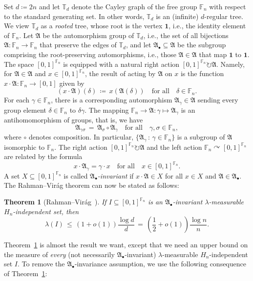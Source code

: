 \documentclass[10pt]{amsart}
\newtheorem{theo}[cdrthm]{Theorem}
\theoremstyle{definition}
\newcommand{\0}{\varnothing}
\newcommand{\set}[1]{\{#1\}}
\renewcommand{\leq}{\leqslant}
\newcommand{\defeq}{\coloneqq}
\newcommand{\racts}{\circlearrowright}
\newcommand{\F}{\mathbb{F}}
\newcommand{\bbT}{\mathbb{T}}
\newcommand{\bfun}{\mathbf{1}}
\newcommand{\frkA}{\mathfrak{A}}
\begin{document}
Set $d \defeq 2n$ and let $\bbT_d$ denote the Cayley graph of the free group $\F_n$ with respect to the standard generating set. In other words, $\bbT_d$ is an (infinite) $d$-regular tree. We view $\bbT_d$ as a \emph{rooted} tree, whose root is the vertex $\bfun$, i.e., the identity element of $\F_n$. Let $\frkA$ be the automorphism group of $\bbT_d$, i.e., the set of all bijections $\frkA \colon \F_n \to \F_n$ that preserve the edges of $\bbT_d$, and let $\frkA_\bullet \subseteq \frkA$ be the subgroup comprising the root-preserving automorphisms, i.e., those $\frkA \in \frkA$ that map $\bfun$ to $\bfun$. The space $[0,1]^{\F_n}$ is equipped with a natural right action $[0,1]^{\F_n} \racts \frkA$. Namely, for $\frkA \in \frkA$ and $x \in [0,1]^{\F_n}$, the result of acting by $\frkA$ on $x$ is the function $x \cdot \frkA \colon \F_n \to [0,1]$ given by
\[
(x \cdot \frkA)(\delta) \,
\defeq\, x(\frkA(\delta)) \quad \text{for all}\quad \delta \in \F_n.
\]
For each $\gamma \in \F_n$, there is a corresponding automorphism $\frkA_\gamma \in \frkA$ sending every group element $\delta \in \F_n$ to $\delta \gamma$. The mapping $\F_n \to \frkA \colon \gamma \mapsto \frkA_\gamma$ is an antihomomorphism of groups, that is, we have
\[
\frkA_{\gamma \sigma} \,=\, \frkA_\sigma \circ \frkA_\gamma \quad \text{for all}\quad\gamma
, \sigma \in \F_n,
\]
where $\circ$ denotes composition. In particular, $\set{\frkA_\gamma \,:\, \gamma \in \F_n}$ is a subgroup of $\frkA$ isomorphic to $\F_n$. The right action $[0,1]^{\F_n} \racts \frkA$ and the left action $\F_n \curvearrowright [0,1]^{\F_n}$ are related by the formula
\[
x \cdot \frkA_\gamma = \gamma \cdot x \quad \text{for all}\quad x \in [0,1]^{\F_n}.
\]
A set $X \subseteq [0,1]^{\F_n}$ is called \emph{$\frkA_\bullet$-invariant} if $x \cdot \frkA \in X$ for all $x \in X$ and $\frkA \in \frkA_\bullet$. The Rahman--Virág theorem can now be stated as follows:

\begin{theo}[{Rahman--Virág~\cite[Theorem~2.1]{RV}}]\label{theo:RV}
If $I \subseteq [0,1]^{\F_n}$ is an $\frkA_\bullet$-invariant $\lambda$-measurable $H_n$-independent set, then
\[
\lambda(I) \,\leq\, (1+o(1)) \frac{\log d}{d} \,=\, \left(\frac{1}{2} + o(1)\right) \frac{\log n}{n}.
\]
\end{theo}

Theorem~\ref{theo:RV} is almost the result we want, except that we need an upper bound on the measure of \emph{every} (not necessarily $\frkA_\bullet$-invariant) $\lambda$-measurable $H_n$-independent set $I$. To remove the $\frkA_\bullet$-invariance assumption, we use the following consequence of Theorem~\ref{theo:RV}:
\end{document}

